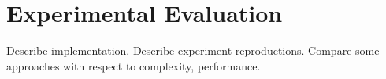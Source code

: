 \section{Experimental Evaluation}

Describe implementation.
Describe experiment reproductions.
Compare some approaches with respect to complexity, performance.
